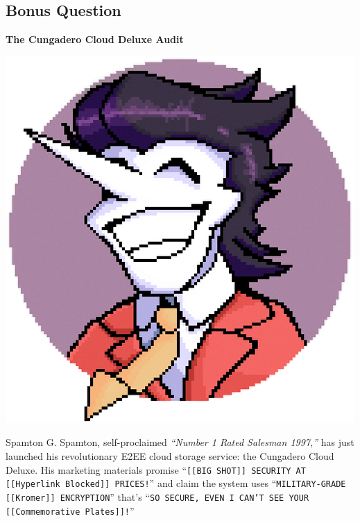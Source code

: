 \documentclass[10pt,a4paper,american]{exam}
\begin{document}
\begin{tcolorbox}[colframe=EarthBrown!30!white,colback=EarthBrown!5!white]
	\section*{Bonus Question}
	\begin{questions}
		\bonusquestion[30] \textbf{The Cungadero Cloud Deluxe Audit}

		\begin{minipage}{0.15\textwidth}
			\centering
			\includegraphics[width=\textwidth]{images/cungadero.png}
		\end{minipage}%
		\hspace{0.05\textwidth}%
		\begin{minipage}{0.73\textwidth}
			Spamton G. Spamton, self-proclaimed \textit{``Number 1 Rated Salesman 1997,''} has just launched his revolutionary E2EE cloud storage service: the Cungadero Cloud Deluxe. His marketing materials promise ``\texttt{[[BIG SHOT]] SECURITY AT [[Hyperlink Blocked]] PRICES!}'' and claim the system uses ``\texttt{MILITARY-GRADE [[Kromer]] ENCRYPTION}'' that's ``\texttt{SO SECURE, EVEN I CAN'T SEE YOUR [[Commemorative Plates]]!}''
		\end{minipage}


\end{questions}
\end{tcolorbox}
\end{document}
